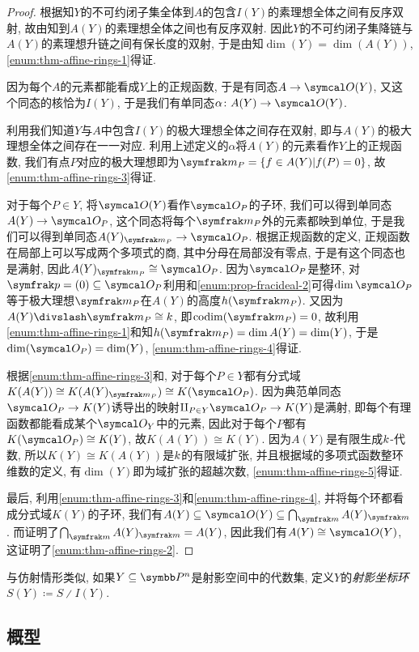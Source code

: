 \begin{proof}
    根据知$Y$的不可约闭子集全体到$A$的包含$I(Y)$的素理想全体之间有反序双射, 故由知到$A(Y)$的素理想全体之间也有反序双射. 因此$Y$的不可约闭子集降链与$A(Y)$的素理想升链之间有保长度的双射, 于是由知$\dim (Y)=\dim (A(Y))$, \ref{enum:thm-affine-rings-1}得证.

    因为每个$A$的元素都能看成$Y$上的正规函数, 于是有同态$A\to \OO (Y)$, 又这个同态的核恰为$I(Y)$, 于是我们有单同态$\alpha\colon A(Y)\to \OO (Y)$.

    利用我们知道$Y$与$A$中包含$I(Y)$的极大理想全体之间存在双射, 即与$A(Y)$的极大理想全体之间存在一一对应. 利用上述定义的$\alpha$将$A(Y)$的元素看作$Y$上的正规函数, 我们有点$P$对应的极大理想即为$\ideal{m}_{P}=\{f\in A(Y)\vert f(P)=0\}$, 故\ref{enum:thm-affine-rings-3}得证.

    对于每个$P\in Y$, 将$\OO (Y)$看作$\OO_P$的子环, 我们可以得到单同态$A(Y)\to \OO_P$, 这个同态将每个$\ideal{m}_P$外的元素都映到单位, 于是我们可以得到单同态$A(Y)_{\ideal{m}_{P}}\to \OO_P$. 根据正规函数的定义, 正规函数在局部上可以写成两个多项式的商, 其中分母在局部没有零点, 于是有这个同态也是满射, 因此$A(Y)_{\ideal{m}_P}\cong \OO_P$. 因为$\OO_P$是整环, 对$\ideal{p}=(0)\subseteq \OO_P$利用和\ref{enum:prop-fracideal-2}可得$\dim \OO_P$等于极大理想$\ideal{m}_P$在$A(Y)$的高度$h(\ideal{m}_P)$. 又因为$A(Y){\divslash}\ideal{m}_P\cong \kk$, 即$\codim (\ideal{m}_P)=0$, 故利用\ref{enum:thm-affine-rings-1}和知$h(\ideal{m}_P)=\dim A(Y)=\dim (Y)$, 于是$\dim (\OO_P)=\dim (Y)$, \ref{enum:thm-affine-rings-4}得证.

    根据\ref{enum:thm-affine-rings-3}和, 对于每个$P\in Y$都有分式域$K(A(Y))\cong K(A(Y)_{\ideal{m}_P})\cong K(\OO_P)$. 因为典范单同态$\OO_P\to K(Y)$诱导出的映射$\amalg_{P\in Y}\OO_P\to K(Y)$是满射, 即每个有理函数都能看成某个$\OO_Y$中的元素, 因此对于每个$P$都有$K(\OO_P)\cong K(Y)$, 故$K(A(Y))\cong K(Y)$. 因为$A(Y)$是有限生成$k$-代数, 所以$K(Y)\cong K(A(Y))$是$k$的有限域扩张, 并且根据域的多项式函数整环维数的定义, 有$\dim (Y)$即为域扩张的超越次数, \ref{enum:thm-affine-rings-5}得证.

    最后, 利用\ref{enum:thm-affine-rings-3}和\ref{enum:thm-affine-rings-4}, 并将每个环都看成分式域$K(Y)$的子环, 我们有$A(Y)\subseteq\OO (Y)\subseteq \bigcap_{\ideal{m}} A(Y)_{\ideal{m}}$. 而证明了$\bigcap_{\ideal{m}} A(Y)_{\ideal{m}}= A(Y)$, 因此我们有$A(Y)\cong \OO(Y)$, 这证明了\ref{enum:thm-affine-rings-2}.
\end{proof}

与仿射情形类似, 如果$Y\subseteq \PP^n$是射影空间中的代数集, 定义$Y$的\emph{射影坐标环}$S(Y)\coloneq S{\divslash}I(Y)$.


\subsection{概型}

